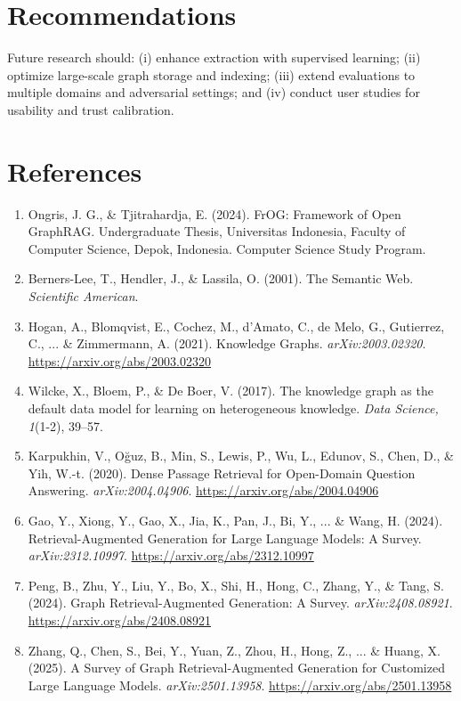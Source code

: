 \documentclass[12pt,a4paper,onecolumn]{article}
\begin{document}
\section*{Recommendations}
Future research should: (i) enhance extraction with supervised learning; (ii) optimize large-scale graph storage and indexing; (iii) extend evaluations to multiple domains and adversarial settings; and (iv) conduct user studies for usability and trust calibration.

\section*{References}
\begingroup\small
\begin{enumerate}
  \item Ongris, J. G., \& Tjitrahardja, E. (2024). FrOG: Framework of Open GraphRAG. Undergraduate Thesis, Universitas Indonesia, Faculty of Computer Science, Depok, Indonesia. Computer Science Study Program.
  \item Berners-Lee, T., Hendler, J., \& Lassila, O. (2001). The Semantic Web. \textit{Scientific American}. 
  \item Hogan, A., Blomqvist, E., Cochez, M., d'Amato, C., de Melo, G., Gutierrez, C., ... \& Zimmermann, A. (2021). Knowledge Graphs. \textit{arXiv:2003.02320}. \url{https://arxiv.org/abs/2003.02320}
  \item Wilcke, X., Bloem, P., \& De Boer, V. (2017). The knowledge graph as the default data model for learning on heterogeneous knowledge. \textit{Data Science, 1}(1-2), 39--57.
  \item Karpukhin, V., Oğuz, B., Min, S., Lewis, P., Wu, L., Edunov, S., Chen, D., \& Yih, W.-t. (2020). Dense Passage Retrieval for Open-Domain Question Answering. \textit{arXiv:2004.04906}. \url{https://arxiv.org/abs/2004.04906}
  \item Gao, Y., Xiong, Y., Gao, X., Jia, K., Pan, J., Bi, Y., ... \& Wang, H. (2024). Retrieval-Augmented Generation for Large Language Models: A Survey. \textit{arXiv:2312.10997}. \url{https://arxiv.org/abs/2312.10997}
  \item Peng, B., Zhu, Y., Liu, Y., Bo, X., Shi, H., Hong, C., Zhang, Y., \& Tang, S. (2024). Graph Retrieval-Augmented Generation: A Survey. \textit{arXiv:2408.08921}. \url{https://arxiv.org/abs/2408.08921}
  \item Zhang, Q., Chen, S., Bei, Y., Yuan, Z., Zhou, H., Hong, Z., ... \& Huang, X. (2025). A Survey of Graph Retrieval-Augmented Generation for Customized Large Language Models. \textit{arXiv:2501.13958}. \url{https://arxiv.org/abs/2501.13958}

\end{enumerate}
\end{document}
